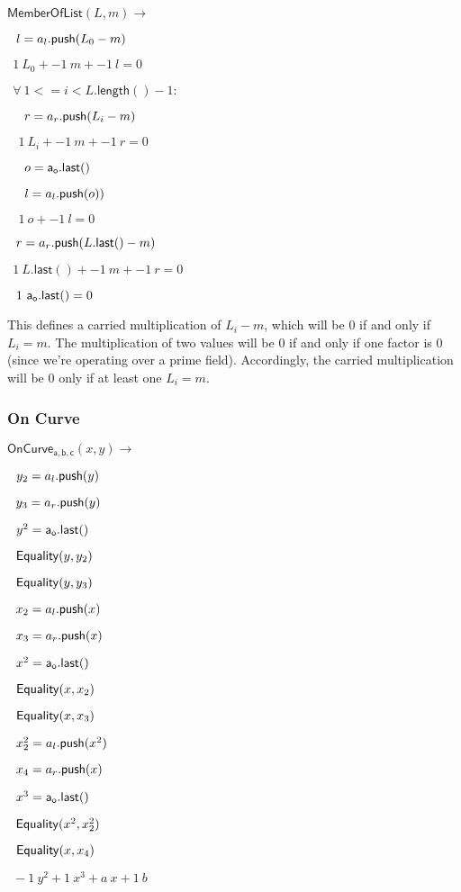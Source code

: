 \documentclass[]{article}
\begin{document}
\newcommand{\memberlist}{\mathsf{MemberOfList}}

$\memberlist(L, m) \rightarrow$

$~~l = a_l\mathsf{.push}(L_0 - m)$

$~~1 ~L_0 + -1 ~m + -1 ~l = 0$

$~~\forall ~1 <= i < L\mathsf{.length}() - 1:$

$~~~~r = a_r\mathsf{.push}(L_i - m)$

$~~~~1 ~L_i + -1 ~m + -1 ~r = 0$

$~~~~o = \mathsf{a_o.last()}$

$~~~~l = a_l\mathsf{.push}(o))$

$~~~~1 ~o + -1 ~l = 0$

$~~r = a_r\mathsf{.push}(L\mathsf{.last}() - m)$

$~~1 ~L\mathsf{.last}() + -1 ~m + -1 ~r = 0$

$~~1 ~\mathsf{a_o.last()} = 0$

This defines a carried multiplication of $L_i - m$, which will be $0$ if and only if $L_i = m$. The multiplication of two values will be $0$ if and only if one factor is $0$ (since we're operating over a prime field). Accordingly, the carried multiplication will be $0$ only if at least one $L_i = m$.

\subsubsection{On Curve}

\newcommand{\oncurve}{\mathsf{OnCurve_{a,b,c}}}

$\oncurve(x, y) \rightarrow$

$~~y_2 = a_l\mathsf{.push}(y)$

$~~y_3 = a_r\mathsf{.push}(y)$

$~~y^2 = \mathsf{a_o.last()}$

$~~\mathsf{Equality}(y, y_2)$

$~~\mathsf{Equality}(y, y_3)$

$~~x_2 = a_l\mathsf{.push}(x)$

$~~x_3 = a_r\mathsf{.push}(x)$

$~~x^2 = \mathsf{a_o.last()}$

$~~\mathsf{Equality}(x, x_2)$

$~~\mathsf{Equality}(x, x_3)$

$~~x^2_2 = a_l\mathsf{.push}(x^2)$

$~~x_4 = a_r\mathsf{.push}(x)$

$~~x^3 = \mathsf{a_o.last()}$

$~~\mathsf{Equality}(x^2, x^2_2)$

$~~\mathsf{Equality}(x, x_4)$

$~~-1 ~y^2 + 1 ~x^3 + a ~x + 1 ~b$
\end{document}
